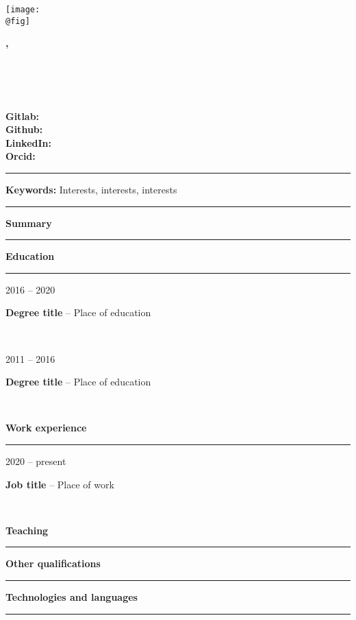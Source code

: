 \documentclass[10pt,A4]{article}
\author{Jane Doe}
\date{\today}
\makeatletter
\newcommand{\cvsection}[1]
{
    \begin{center}
	    \large\textcolor{maincolor}{\textbf{#1}}
	    \vspace{0.2cm}
	    \textcolor{sepcolor}{\hrule}
    \end{center}
}
\newcommand{\cvitem}[4] %
{
\begin{minipage}[t]{.15\textwidth} 
\centering
   \textcolor{maincolor}{#1} 
\end{minipage}
    \hfill
    \noindent
\begin{minipage}[t]{.82\textwidth}
{\textbf{#2}} -- \textcolor{maincolor}{#3}\\
{#4}
\end{minipage}\\
\vspace{0.2cm}
}
\newcommand{\cvkeywords}[1] 
{
\centering
\vspace{0.4cm}
\textcolor{sepcolor}{\hrule}
{\textcolor{maincolor}{\large\textbf{Keywords: }}#1}\\
\textcolor{sepcolor}{\hrule}
\raggedright
}
\newcommand{\cvtitle}
{
\begin{minipage}{.30\textwidth}
\centering
    \texttt{[image: \\@fig]}
\end{minipage}
    \hfill
    \noindent
\begin{minipage}{.68\textwidth}
\raggedright 
    {\textcolor{maincolor}{\huge\textbf{\@author, \@degree}}}\\
    \vspace{0.2cm}
    \begin{minipage}{.48\textwidth}
	    {{\@date}}\\
	    {{\@address}}\\
        {{\@phone}}\\
	    {{\@email}}
	\end{minipage}
    \hfill
    \noindent
    \begin{minipage}{.48\textwidth}
        \raggedright
	    \textbf{Gitlab:} \@gitlab\\
	    \textbf{Github:} \@github\\
	    \textbf{LinkedIn:} \@linkedin\\
	    \textbf{Orcid:} \@orcid
	\end{minipage}
	\vspace{0.2cm}
\end{minipage}
\vspace{0.2cm}
}
\makeatother
\begin{document}
\cvtitle
\cvkeywords{Interests, interests, interests}
\cvsection{Summary}
\lipsum[1-1]

\cvsection{Education}
\cvitem{2016 -- 2020}{Degree title}{Place of education}{\lipsum[1-1]}
\cvitem{2011 -- 2016}{Degree title}{Place of education}{\lipsum[1-1]}
\clearpage %
\cvsection{Work experience}
\cvitem{2020 -- present}{Job title}{Place of work}{\lipsum[1-1]}
\cvsection{Teaching}
\cvsection{Other qualifications}
\cvsection{Technologies and languages}
{\lipsum[1-1]}
\end{document}
